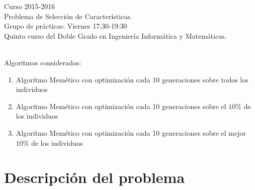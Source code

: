 \documentclass[11pt,leqno]{article}
\begin{document}
\begin{center}
Curso 2015-2016\\

Problema de Selección de Características.\\ 

Grupo de prácticas: Viernes 17:30-19:30\\

Quinto curso del Doble Grado en Ingeniería Informática y Matemáticas.\\
\textit{ }\\
\end{center}

Algoritmos considerados:
\begin{enumerate}
\item Algoritmo Memético con optimización cada 10 generaciones sobre todos los individuos
\item Algoritmo Memético con optimización cada 10 generaciones sobre el $10\%$ de los individuos
\item Algoritmo Memético con optimización cada 10 generaciones sobre el mejor $10\%$ de los individuos
\end{enumerate}

\newpage

\tableofcontents
\newpage

\section{Descripción del problema}
\end{document}
